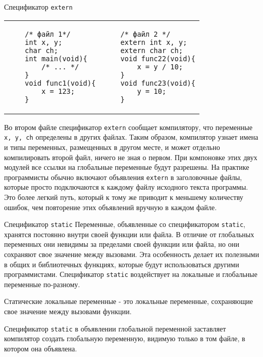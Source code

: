 \documentclass[xcolor=table]{beamer}
\begin{document}
\begin{frame}[fragile]{Спецификатор \texttt{extern}}
\begin{tabular}{p{5cm} p{5cm}}
    \begin{verbatim}
    /* файл 1*/
    int x, y;
    char ch;
    int main(void){
        /* ... */
    }
    void func1(void){
        x = 123;
    }
    \end{verbatim}
     &
    \begin{verbatim}
    /* файл 2 */
    extern int x, y;
    extern char ch;
    void func22(void){
        x = y / 10;
    }
    void func23(void){
        y = 10;
    }
    \end{verbatim}
\end{tabular}
    
    Во втором файле спецификатор \texttt{extern} сообщает компилятору, что переменные \texttt{x, y, ch} определены в других файлах. Таким образом, компилятор узнает имена и типы переменных, размещенных в другом месте, и может отдельно компилировать второй файл, ничего не зная о первом. При компоновке этих двух модулей все ссылки на глобальные переменные будут разрешены. На практике программисты обычно включают объявления \texttt{extern} в заголовочные файлы, которые просто подключаются к каждому файлу исходного текста программы. Это более легкий путь, который к тому же приводит к меньшему количеству ошибок, чем повторение этих объявлений вручную в каждом файле.
\end{frame}

\begin{frame}{Спецификатор \texttt{static}}
    Переменные, объявленные со спецификатором \texttt{static}, хранятся постоянно внутри своей функции или файла. В отличие от глобальных переменных они невидимы за пределами своей функции или файла, но они сохраняют свое значение между вызовами. Эта особенность делает их полезными в общих и библиотечных функциях, которые будут использоваться другими программистами. Спецификатор \texttt{static} воздействует на локальные и глобальные переменные по-разному.
    
    Статические локальные переменные - это локальные переменные, сохраняющие свое значение между вызовами функции. 
    
    Спецификатор \texttt{static} в объявлении глобальной переменной заставляет компилятор создать глобальную переменную, видимую только в том файле, в котором она объявлена.
\end{frame}
\end{document}
